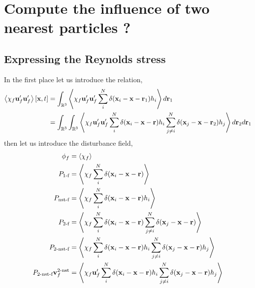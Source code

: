 \section{Compute the influence of two nearest particles ? }


\subsection{Expressing the Reynolds stress}

In the first place let us introduce the relation, 
\begin{align*}
    \left<\chi_f \textbf{u}_f'\textbf{u}_f'\right>[\textbf{x},t]
    &= 
    \int_{\mathbb{R}^3}
    \left<\chi_f \textbf{u}_f'\textbf{u}_f' 
    \sum_i^N \delta(\textbf{x}_i - \textbf{x}- \textbf{r}_1)
    h_i
    \right>
    d\textbf{r}_1\\
    &= 
    \int_{\mathbb{R}^3}
    \int_{\mathbb{R}^3}
    \left<\chi_f \textbf{u}_f'\textbf{u}_f' 
    \sum_i^N \delta(\textbf{x}_i - \textbf{x}- \textbf{r})
    h_i
    \sum_{j\neq i}^N \delta(\textbf{x}_j - \textbf{x}- \textbf{r}_2)
    h_j
    \right>
    d\textbf{r}_2
    d\textbf{r}_1
\end{align*}
then let us introduce the disturbance field, 
\begin{align}
    \phi_f
    &= 
    \left<\chi_f 
    \right>\\
    P_\text{1-f}
    &= 
    \left<\chi_f  
    \sum_i^N \delta(\textbf{x}_i - \textbf{x}- \textbf{r})
    \right>\\
    P_\text{nst-f}
    &= 
    \left<\chi_f  
    \sum_i^N \delta(\textbf{x}_i - \textbf{x}- \textbf{r})
    h_i
    \right>\\
    P_\text{2-f}
    &= 
    \left<\chi_f  
    \sum_i^N \delta(\textbf{x}_i - \textbf{x}- \textbf{r})
    \sum_{j\neq i}^N \delta(\textbf{x}_j - \textbf{x}- \textbf{r})
    \right>\\
    P_\text{2-nst-f}
    &= 
    \left<\chi_f  
    \sum_i^N \delta(\textbf{x}_i - \textbf{x}- \textbf{r})
    h_i
    \sum_{j\neq i}^N \delta(\textbf{x}_j - \textbf{x}- \textbf{r})
    h_j
    \right>\\
    P_\text{2-nst-f} \textbf{v}_f^\text{2-nst}
    &= 
    \left<\chi_f \textbf{u}_f' 
    \sum_i^N \delta(\textbf{x}_i - \textbf{x}- \textbf{r})
    h_i
    \sum_{j\neq i}^N \delta(\textbf{x}_j - \textbf{x}- \textbf{r})
    h_j
    \right>\\
\end{align}
